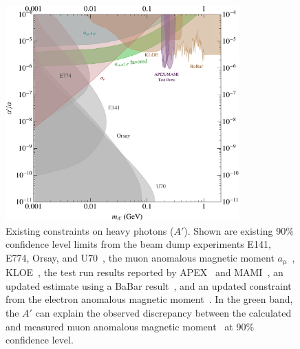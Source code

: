 \begin{figure}[h]
\centering
\includegraphics[width=0.8\textwidth]{limit_g-2_electron.pdf} 
\caption{ Existing constraints on heavy photons ($A'$). 
Shown are existing 90\% confidence level limits from the beam dump experiments 
E141, E774, Orsay, and U70~\cite{Bjorken:2009mm,Blumlein:2011mv,Andreas:2012mt,Riordan:1987aw,Bross:1989mp,Davier:1989wz,Konaka:1986cb}, 
the muon anomalous magnetic moment $a_\mu$~\cite{Pospelov:2008zw},  
KLOE~\cite{Collaboration:2011zc}, 
the test run results reported by APEX~\cite{Abrahamyan:2011gv} and MAMI~\cite{Merkel:2011ze}, 
an updated estimate using a BaBar result~\cite{Bjorken:2009mm,Reece:2009un,Aubert:2009cp}, 
and an updated constraint from the electron anomalous magnetic moment~\cite{endo:g2e,Davoudiasl:2012ig}. 
In the green band, the $A'$ can explain the observed discrepancy between the
calculated and measured muon anomalous magnetic moment~\cite{Pospelov:2008zw} 
at 90\% confidence level.
}
\label{fig:hspaw-heavy-A'}
\end{figure}

